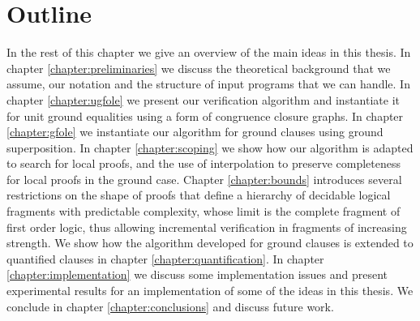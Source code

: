 %
%


\section{Outline}
In the rest of this chapter we give an overview of the main ideas in this thesis.
In chapter \ref{chapter:preliminaries} we discuss the theoretical background that we assume, our notation and the structure of input programs that we can handle.
In chapter \ref{chapter:ugfole} we present our verification algorithm and instantiate it for unit ground equalities using a form of congruence closure graphs.
In chapter \ref{chapter:gfole} we instantiate our algorithm for ground clauses using ground superposition.
In chapter \ref{chapter:scoping} we show how our algorithm is adapted to search for local proofs, and the use of interpolation to preserve completeness for local proofs in the ground case.
Chapter \ref{chapter:bounds} introduces several restrictions on the shape of proofs that define a hierarchy of decidable logical fragments with predictable complexity, whose limit is the complete fragment of first order logic, thus allowing incremental verification in fragments of increasing strength.
We show how the algorithm developed for ground clauses is extended to quantified clauses in chapter \ref{chapter:quantification}.
In chapter \ref{chapter:implementation} we discuss some implementation issues and present experimental results for an implementation of some of the ideas in this thesis.
We conclude in chapter \ref{chapter:conclusions} and discuss future work.



